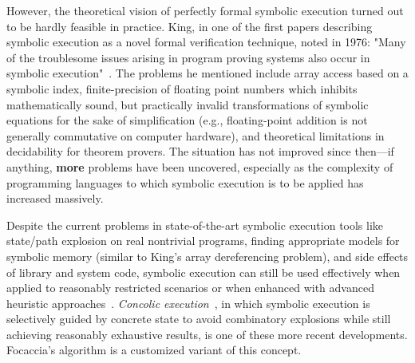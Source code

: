 However, the theoretical vision of perfectly formal symbolic execution turned out to be hardly feasible in practice.
King, in one of the first papers describing symbolic execution as a novel formal verification technique, noted in 1976:
"Many of the troublesome issues arising in program proving systems also occur in symbolic
execution"~\cite{King1976SymbExec}. The problems he mentioned include array access based on a symbolic index,
finite-precision of floating point numbers which inhibits mathematically sound, but practically invalid transformations
of symbolic equations for the sake of simplification (e.g., floating-point addition is not generally commutative on
computer hardware), and theoretical limitations in decidability for theorem provers. The situation has not improved
since then---if anything, \textbf{more} problems have been uncovered, especially as the complexity of programming
languages to which symbolic execution is to be applied has increased massively.

Despite the current problems in state-of-the-art symbolic execution tools like state/path explosion on real nontrivial
programs, finding appropriate models for symbolic memory (similar to King's array dereferencing problem), and side
effects of library and system code, symbolic execution can still be used effectively when applied to reasonably
restricted scenarios or when enhanced with advanced heuristic approaches~\cite{Baldoni2018SymbexecSurvey}.
\textit{Concolic execution}~\cite{Sen+2005Cute, Sen2007ConcolicTesting}, in which symbolic execution is selectively
guided by concrete state to avoid combinatory explosions while still achieving reasonably exhaustive results, is one of
these more recent developments. Focaccia's algorithm is a customized variant of this concept.

%
%

